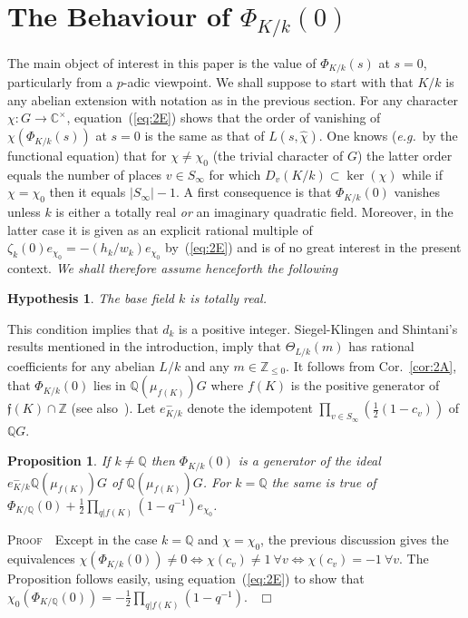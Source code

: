 \documentclass[12pt]{article}
\newtheorem{hyp}{Hypothesis}[section]
\newtheorem{prop}{Proposition}[section]
\newcounter{rem}[section]%
\newcommand{\bbC}{\ensuremath{\mathbb{C}}}
\newcommand{\bbQ}{\ensuremath{\mathbb{Q}}}
\newcommand{\bbZ}{\ensuremath{\mathbb{Z}}}
\newcommand{\beql}[1]{\begin{equation}\label{#1}}
\newcommand{\bPf}{\noindent \textsc{Proof\ }}
\newcommand{\eeq}{\end{equation}}
\newcommand{\eg}{\emph{e.g.}}
\newcommand{\ePf}{\hspace*{\fill}~$\Box$\vertsp\par}%
\newcommand{\ff}{\ensuremath{\mathfrak{f}}}
\newcommand{\fm}{\ensuremath{\mathfrak{m}}}
\newcommand{\half}{\frac{1}{2}}
\newcommand{\inv}{^{-1}}%
\newcommand{\refeq}[1]{~(\ref{eq:#1})}
\newcommand{\rem}{\refstepcounter{rem}\noindent{\sc Remark \therem}}%
\renewcommand{\therem}{\thesection.\arabic{rem}}
\newcommand{\vertsp}{\vspace{1ex}}
\newcommand{\PhiKko}{\ensuremath{\Phi_{K/k}(0)}}
\newcommand{\PhiKks}{\ensuremath{\Phi_{K/k}(s)}}
\begin{document}
\section{The Behaviour of $\Phi_{K/k}(0)$}\label{sec:behav}
The main object of interest in this paper is the value of $\Phi_{K/k}(s)$ at $s=0$,
particularly from a $p$-adic viewpoint.
We shall suppose to start with that $K/k$ is any abelian extension
with notation as in the previous section.
For any character $\chi:G\rightarrow\bbC^\times$,
equation\refeq{2E} shows that the order of
vanishing of $\chi(\PhiKks)$ at $s=0$ is the same as that of
$L(s,\hat{\chi})$. One knows (\eg\ by the functional equation) that for
$\chi\neq\chi_0$ (the trivial character of $G$) the latter order
equals the number of places $v\in S_\infty$  for which
$D_v(K/k)\subset\ker(\chi)$ while if $\chi=\chi_0$ then it equals
$|S_\infty|-1$. A first consequence is that $\PhiKko$ vanishes
unless $k$ is either a totally real \emph{or} an imaginary quadratic
field. Moreover, in the latter case it is given as an explicit rational multiple of
$\zeta_k(0)e_{\chi_0}=-(h_k/w_k)e_{\chi_0}$ by\refeq{2E}
and is of no great interest in the present context.
\emph{We shall therefore assume henceforth the following}
\begin{hyp}
The base field $k$ is totally real.
\end{hyp}
This condition implies that $d_k$ is a positive integer.
Siegel-Klingen and Shintani's results mentioned in the introduction,
imply that $\Theta_{L/k}(m)$ has rational coefficients for any abelian
$L/k$ and any $m\in\bbZ_{\leq 0}$. It follows from Cor.~\ref{cor:2A}, that $\PhiKko$ lies in
$\bbQ(\mu_{f(K)})G$ where $f(K)$ is the positive generator of $\ff(K)\cap
\bbZ$ (see also~\cite[Lemma 3.3]{zetap1}).
Let $e^-_{K/k}$ denote the idempotent $\prod_{v\in S_\infty}(\half(1-c_v))$ of $\bbQ G$.
\begin{prop}\label{prop:2A} If $k\neq \bbQ$
then $\PhiKko$ is a generator of the ideal $e^-_{K/k}\bbQ(\mu_{f(K)})G$
of $\bbQ(\mu_{f(K)})G$. For $k=\bbQ$ the same is true of
$\Phi_{K/\bbQ}(0)+\half\prod_{q|f(K)}(1-q\inv)e_{\chi_0}$.
\end{prop}
\bPf\ Except in the case $k=\bbQ$ and
$\chi=\chi_0$, the previous discussion gives the equivalences
$\chi(\PhiKko)\neq 0\Leftrightarrow\chi(c_v)\neq 1\ \forall v
\Leftrightarrow\chi(c_v)=-1\ \forall v$.
The Proposition follows easily, using equation\refeq{2E}
to show that $\chi_0(\Phi_{K/\bbQ}(0))=-\half\prod_{q|f(K)}(1-q\inv)$.
\ePf
\rem\label{rem:2A.5}
\end{document}
